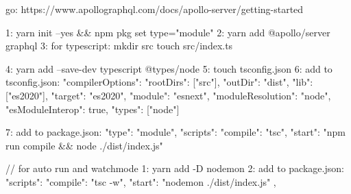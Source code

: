 go: https://www.apollographql.com/docs/apollo-server/getting-started

1: yarn init --yes && npm pkg set type="module"
2: yarn add @apollo/server graphql
3: for typescript: 
    mkdir src
    touch src/index.ts

4: yarn add --save-dev typescript @types/node
5: touch tsconfig.json
6: add to tsconfig.json:
{
    "compilerOptions": {
      "rootDirs": ["src"],
      "outDir": "dist",
      "lib": ["es2020"],
      "target": "es2020",
      "module": "esnext",
      "moduleResolution": "node",
      "esModuleInterop": true,
      "types": ["node"]
    }
  }

  7: add to package.json:
  "type": "module",
  "scripts": {
    "compile": "tsc",
    "start": "npm run compile && node ./dist/index.js"
  }



  // for auto run and watchmode
  1: yarn add -D nodemon
  2: add to package.json:
  "scripts": {
    "compile": "tsc -w",
    "start": "nodemon ./dist/index.js"
  },

